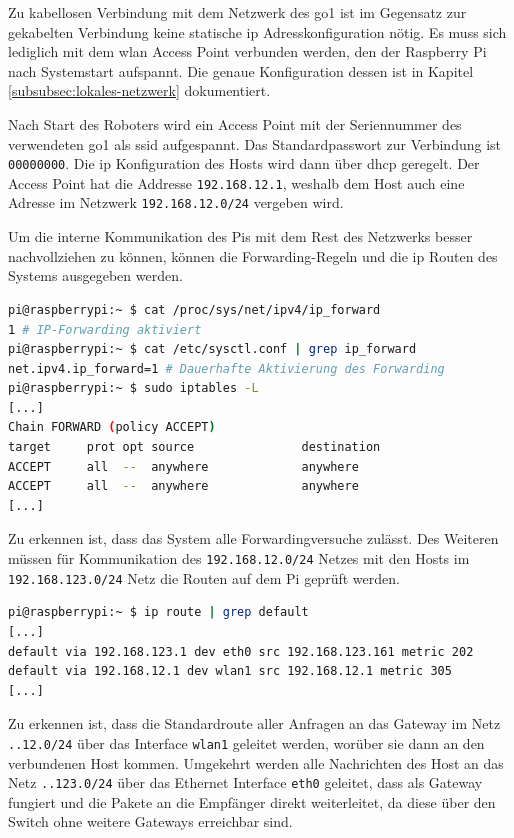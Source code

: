 
Zu kabellosen Verbindung mit dem Netzwerk des \gls{go1} ist im Gegensatz zur gekabelten Verbindung keine statische \gls{ip}
Adresskonfiguration nötig.
Es muss sich lediglich mit dem \gls{wlan} Access Point verbunden werden, den der Raspberry Pi nach Systemstart aufspannt.
Die genaue Konfiguration dessen ist in Kapitel \ref{subsubsec:lokales-netzwerk} dokumentiert.

Nach Start des Roboters wird ein Access Point mit der Seriennummer des verwendeten \gls{go1} als \gls{ssid} aufgespannt.
Das Standardpasswort zur Verbindung ist \texttt{00000000}.
Die \gls{ip} Konfiguration des Hosts wird dann über \gls{dhcp} geregelt.
Der Access Point hat die Addresse \texttt{192.168.12.1}, weshalb dem Host auch eine Adresse im Netzwerk
\texttt{192.168.12.0/24} vergeben wird.

Um die interne Kommunikation des Pis mit dem Rest des Netzwerks besser nachvollziehen zu können, können die Forwarding-Regeln
und die \gls{ip} Routen des Systems ausgegeben werden.

\begin{lstlisting}[language=Bash]
pi@raspberrypi:~ $ cat /proc/sys/net/ipv4/ip_forward
1 # IP-Forwarding aktiviert
pi@raspberrypi:~ $ cat /etc/sysctl.conf | grep ip_forward
net.ipv4.ip_forward=1 # Dauerhafte Aktivierung des Forwarding
pi@raspberrypi:~ $ sudo iptables -L
[...]
Chain FORWARD (policy ACCEPT)
target     prot opt source               destination
ACCEPT     all  --  anywhere             anywhere
ACCEPT     all  --  anywhere             anywhere
[...]
\end{lstlisting}

\noindent Zu erkennen ist, dass das System alle Forwardingversuche zulässt.
Des Weiteren müssen für Kommunikation des \texttt{192.168.12.0/24} Netzes mit den Hosts im \texttt{192.168.123.0/24} Netz
die Routen auf dem Pi geprüft werden.

\begin{lstlisting}[language=Bash]
pi@raspberrypi:~ $ ip route | grep default
[...]
default via 192.168.123.1 dev eth0 src 192.168.123.161 metric 202
default via 192.168.12.1 dev wlan1 src 192.168.12.1 metric 305
[...]
\end{lstlisting}

\noindent Zu erkennen ist, dass die Standardroute aller Anfragen an das Gateway im Netz \texttt{..12.0/24} über das
Interface \texttt{wlan1} geleitet werden, worüber sie dann an den verbundenen Host kommen.
Umgekehrt werden alle Nachrichten des Host an das Netz \texttt{..123.0/24} über das Ethernet Interface \texttt{eth0}
geleitet, dass als Gateway fungiert und die Pakete an die Empfänger direkt weiterleitet, da diese über den Switch ohne
weitere Gateways erreichbar sind.

